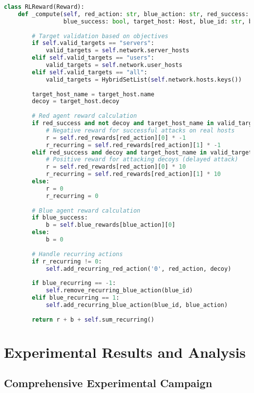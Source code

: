 \documentclass[12pt,a4paper]{article}
\begin{document}
\begin{lstlisting}[language=Python, caption=RL Reward Implementation]
class RLReward(Reward):
    def _compute(self, red_action: str, blue_action: str, red_success: bool, 
                 blue_success: bool, target_host: Host, blue_id: str, blue_recurring: int) -> float:
        
        # Target validation based on objectives
        if self.valid_targets == "servers":
            valid_targets = self.network.server_hosts
        elif self.valid_targets == "users":
            valid_targets = self.network.user_hosts
        elif self.valid_targets == "all":
            valid_targets = HybridSetList(self.network.hosts.keys())
        
        target_host_name = target_host.name
        decoy = target_host.decoy
        
        # Red agent reward calculation
        if red_success and not decoy and target_host_name in valid_targets:
            # Negative reward for successful attacks on real hosts
            r = self.red_rewards[red_action][0] * -1
            r_recurring = self.red_rewards[red_action][1] * -1
        elif red_success and decoy and target_host_name in valid_targets:
            # Positive reward for attacking decoys (delayed attack)
            r = self.red_rewards[red_action][0] * 10
            r_recurring = self.red_rewards[red_action][1] * 10
        else:
            r = 0
            r_recurring = 0
        
        # Blue agent reward calculation
        if blue_success:
            b = self.blue_rewards[blue_action][0]
        else:
            b = 0
        
        # Handle recurring actions
        if r_recurring != 0:
            self.add_recurring_red_action('0', red_action, decoy)
        
        if blue_recurring == -1:
            self.remove_recurring_blue_action(blue_id)
        elif blue_recurring == 1:
            self.add_recurring_blue_action(blue_id, blue_action)
        
        return r + b + self.sum_recurring()
\end{lstlisting}

\section{Experimental Results and Analysis}

\subsection{Comprehensive Experimental Campaign}
\end{document}
